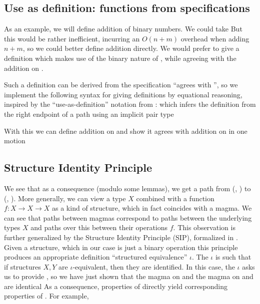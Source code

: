 \documentclass[Main.tex]{subfiles}
\begin{document}
\subsection{Use as definition: functions from specifications}\label{ssec:useas}
As an example, we will define addition of binary numbers. We could take
But this would be rather inefficient, incurring an $O(n + m)$ overhead when adding $n + m$, so we could better define addition directly. We would prefer to give a definition which makes use of the binary nature of \bL{}, while agreeing with the addition on \bN{}.

Such a definition can be derived from the specification ``agrees with \AgdaFunction{\_+\_}'', so we implement the following syntax for giving definitions by equational reasoning, inspired by the ``use-as-definition'' notation from \cite{calcdata}:
which infers the definition from the right endpoint of a path using an implicit pair type

With this we can define addition on \bL{} and show it agrees with addition on \bN{} in one motion

\subsection{Structure Identity Principle}
We see that as a consequence (modulo some  lemmas), we get a path from (\bN{}, ) to (\bL{}, ). More generally, we can view a type $X$ combined with a function $f: X \to X \to X$ as a kind of structure, which in fact coincides with a magma. We can see that paths between magmas correspond to paths between the underlying types $X$ and paths over this between their operations $f$. This observation is further generalized by the Structure Identity Principle (SIP), formalized in \cite{iri}. Given a structure, which in our case is just a binary operation
this principle produces an appropriate definition ``structured equivalence'' $\iota$. The $\iota$ is such that if structures $X, Y$ are $\iota$-equivalent, then they are identified. In this case, the $\iota$ asks us to provide , so we have just shown that the  magma on \bL{}
and the \AgdaFunction{\_+\_} magma on \bN{} and are identical
As a consequence, properties of \AgdaFunction{\_+\_} directly yield corresponding properties of . For example,
\end{document}
